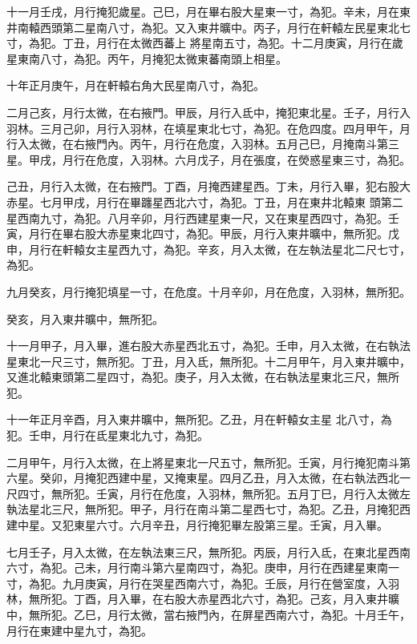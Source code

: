 \begin{pinyinscope}
 十一月壬戌，月行掩犯歲星。己巳，月在畢右股大星東一寸，為犯。辛未，月在東井南轅西頭第二星南八寸，為犯。又入東井曠中。丙子，月行在軒轅左民星東北七寸，為犯。丁丑，月行在太微西蕃上
 將星南五寸，為犯。十二月庚寅，月行在歲星東南八寸，為犯。丙午，月掩犯太微東蕃南頭上相星。



 十年正月庚午，月在軒轅右角大民星南八寸，為犯。



 二月己亥，月行太微，在右掖門。甲辰，月行入氐中，掩犯東北星。壬子，月行入羽林。三月己卯，月行入羽林，在填星東北七寸，為犯。在危四度。四月甲午，月行入太微，在右掖門內。丙午，月行在危度，入羽林。五月己巳，月掩南斗第三星。甲戌，月行在危度，入羽林。六月戊子，月在張度，在熒惑星東三寸，為犯。



 己丑，月行入太微，在右掖門。丁酉，月掩西建星西。丁未，月行入畢，犯右股大赤星。七月甲戌，月行在畢躔星西北六寸，為犯。丁丑，月在東井北轅東
 頭第二星西南九寸，為犯。八月辛卯，月行西建星東一尺，又在東星西四寸，為犯。壬寅，月行在畢右股大赤星東北四寸，為犯。甲辰，月行入東井曠中，無所犯。戊申，月行在軒轅女主星西九寸，為犯。辛亥，月入太微，在左執法星北二尺七寸，為犯。



 九月癸亥，月行掩犯填星一寸，在危度。十月辛卯，月在危度，入羽林，無所犯。



 癸亥，月入東井曠中，無所犯。



 十一月甲子，月入畢，進右股大赤星西北五寸，為犯。壬申，月入太微，在右執法星東北一尺三寸，無所犯。丁丑，月入氐，無所犯。十二月甲午，月入東井曠中，又進北轅東頭第二星四寸，為犯。庚子，月入太微，在右執法星東北三尺，無所犯。



 十一年正月辛酉，月入東井曠中，無所犯。乙丑，月在軒轅女主星
 北八寸，為犯。壬申，月行在氐星東北九寸，為犯。



 二月甲午，月行入太微，在上將星東北一尺五寸，無所犯。壬寅，月行掩犯南斗第六星。癸卯，月掩犯西建中星，又掩東星。四月乙丑，月入太微，在右執法西北一尺四寸，無所犯。壬寅，月行在危度，入羽林，無所犯。五月丁巳，月行入太微左執法星北三尺，無所犯。甲子，月行在南斗第二星西七寸，為犯。乙丑，月掩犯西建中星。又犯東星六寸。六月辛丑，月行掩犯畢左股第三星。壬寅，月入畢。



 七月壬子，月入太微，在左執法東三尺，無所犯。丙辰，月行入氐，在東北星西南六寸，為犯。己未，月行南斗第六星南四寸，為犯。庚申，月行在西建星東南一寸，為犯。九月庚寅，月行在哭星西南六寸，為犯。壬辰，月行在營室度，入羽
 林，無所犯。丁酉，月入畢，在右股大赤星西北六寸，為犯。己亥，月入東井曠中，無所犯。乙巳，月行太微，當右掖門內，在屏星西南六寸，為犯。十月壬午，月行在東建中星九寸，為犯。




\end{pinyinscope}
